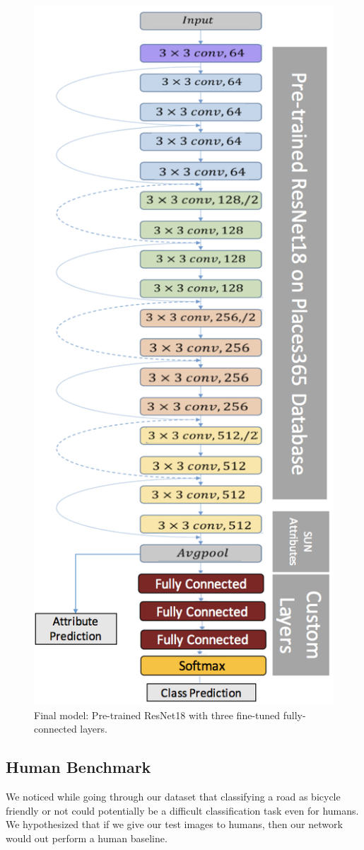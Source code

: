 \documentclass[10pt,twocolumn,letterpaper]{article}
\begin{document}
\begin{figure}[t]
\begin{center}
	\includegraphics[width=.75\linewidth]{model.png}
\end{center}
	\caption{Final model: Pre-trained ResNet18 with three fine-tuned fully-connected layers.}
\label{fig:long}
\label{fig:onecol}
\end{figure}

\subsection{Human Benchmark}
We noticed while going through our dataset that classifying a road as bicycle friendly or not could potentially be a difficult classification task even for humans. We hypothesized that if we give our test images to humans, then our network would out perform a human baseline. 
\end{document}
